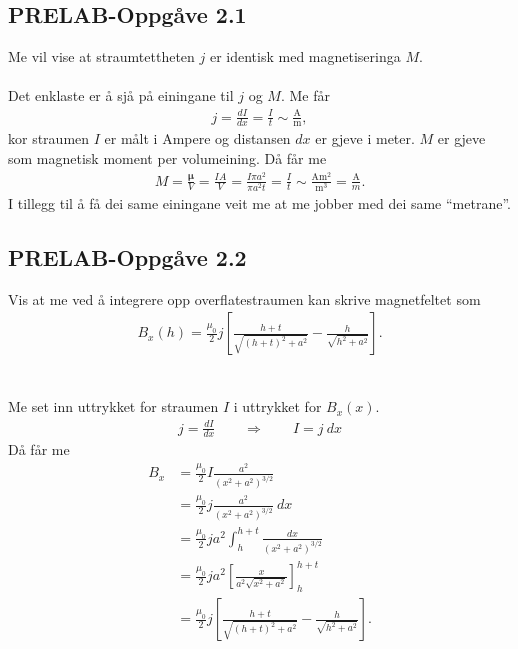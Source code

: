 \documentclass[11pt, a4paper]{article}
\newcommand{\vb}{\mathbf}
\begin{document}
  \subsection*{PRELAB-Oppgåve 2.1}
    Me vil vise at straumtettheten $j$ er identisk med magnetiseringa $M$. \\ \\
    Det enklaste er å sjå på einingane til $j$ og $M$. Me får
    \begin{align*}
      j = \frac{dI}{dx} = \frac{I}{t} \sim \frac{\text{A}}{\text{m}},
    \end{align*}
    kor straumen $I$ er målt i Ampere og distansen $dx$ er gjeve i meter. $M$ er gjeve som magnetisk moment per volumeining. Då får me
    \begin{align*}
      M = \frac{\vb{\mu}}{V} = \frac{IA}{V} = \frac{I\pi a^2}{\pi a^2t} = \frac{I}{t} \sim \frac{\text{A}\text{m}^2}{\text{m}^3} = \frac{\text{A}}{{m}}.
    \end{align*}
    I tillegg til å få dei same einingane veit me at me jobber med dei same ``metrane''.

  \subsection*{PRELAB-Oppgåve 2.2}
    Vis at me ved å integrere opp overflatestraumen kan skrive magnetfeltet som
    \begin{align*}
      B_x(h) = \frac{\mu_0}{2}j\left[ \frac{h + t}{\sqrt{(h + t)^2 + a^2}} - \frac{h}{\sqrt{h^2 + a^2}} \right].
    \end{align*} \\ \\
    Me set inn uttrykket for straumen $I$ i uttrykket for $B_x(x)$.
    \begin{align*}
      j = \frac{dI}{dx} \qquad \Rightarrow \qquad I = j\ dx
    \end{align*}
    Då får me 
    \begin{align*}
      B_x &= \frac{\mu_0}{2}I \frac{a^2}{(x^2 + a^2)^{3/2}} \\
      &= \frac{\mu_0}{2}j\frac{a^2}{(x^2 + a^2)^{3/2}}\ dx \\
      &= \frac{\mu_0}{2}ja^2\int_h^{h + t}\frac{dx}{(x^2 + a^2)^{3/2}} \\
      &= \frac{\mu_0}{2}ja^2\left[ \frac{x}{a^2\sqrt{x^2 + a^2}} \right]_h^{h + t} \\
      &= \frac{\mu_0}{2}j\left[ \frac{h + t}{\sqrt{(h + t)^2 + a^2}} - \frac{h}{\sqrt{h^2 + a^2}} \right].
    \end{align*}
\end{document}
